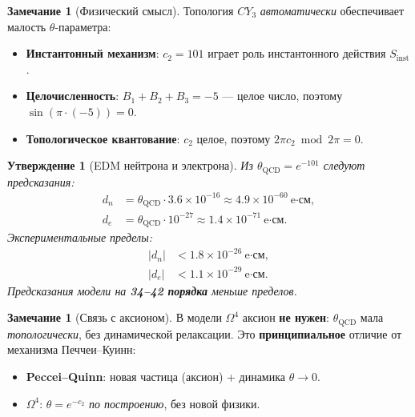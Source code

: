 \documentclass[11pt,a4paper]{article}
\newcommand{\CY}{\ensuremath{CY_3}}
\newcommand{\Om}{\ensuremath{\Omega^4}}
\newtheorem{proposition}[theorem]{Утверждение}
\theoremstyle{definition}
\newtheorem{remark}[theorem]{Замечание}
\begin{document}
\begin{remark}[Физический смысл]
\label{rem:strong-cp-meaning}
Топология $\CY$ \emph{автоматически} обеспечивает малость $\theta$-параметра:
\begin{itemize}
    \item \textbf{Инстантонный механизм}: $c_2 = 101$ играет роль
          инстантонного действия $S_{\text{inst}}$.
    \item \textbf{Целочисленность}: $B_1 + B_2 + B_3 = -5$ — целое
          число, поэтому $\sin(\pi \cdot (-5)) = 0$.
    \item \textbf{Топологическое квантование}: $c_2$ целое, поэтому
          $2\pi c_2 \bmod 2\pi = 0$.
\end{itemize}
\end{remark}

\begin{proposition}[EDM нейтрона и электрона]
\label{prop:edm-predictions}
Из $\theta_{\text{QCD}} = e^{-101}$ следуют предсказания:
\begin{align}
    d_n &= \theta_{\text{QCD}} \cdot 3.6 \times 10^{-16}
        \approx 4.9 \times 10^{-60}~\text{e·см}, \\
    d_e &= \theta_{\text{QCD}} \cdot 10^{-27}
        \approx 1.4 \times 10^{-71}~\text{e·см}.
\end{align}
Экспериментальные пределы:
\begin{align}
    |d_n| &< 1.8 \times 10^{-26}~\text{e·см}, \\
    |d_e| &< 1.1 \times 10^{-29}~\text{e·см}.
\end{align}
Предсказания модели на \textbf{34--42 порядка} меньше пределов.
\end{proposition}

\begin{remark}[Связь с аксионом]
\label{rem:axion-not-needed}
В модели $\Om$ аксион \textbf{не нужен}: $\theta_{\text{QCD}}$ мала
\emph{топологически}, без динамической релаксации. Это
\textbf{принципиальное} отличие от механизма Печчеи--Куинн:
\begin{itemize}
    \item \textbf{Peccei--Quinn}: новая частица (аксион) +
          динамика $\theta \to 0$.
    \item \textbf{$\Om$}: $\theta = e^{-c_2}$ \emph{по построению},
          без новой физики.
\end{itemize}
\end{remark}
\end{document}
